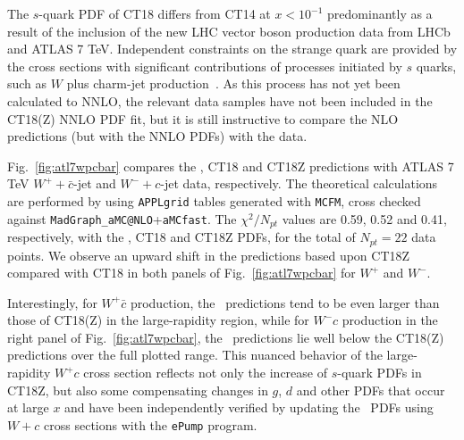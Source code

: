 The $s$-quark PDF of CT18 differs from CT14 at $x < 10^{-1}$ predominantly as a result of the inclusion of the new LHC vector boson production data from  LHCb and ATLAS 7 TeV. Independent constraints on 
the strange quark are provided by the cross sections with significant contributions of  processes initiated by $s$ quarks, such as $W$ plus charm-jet production~\cite{Yalkun:2019gah}. As this process has not yet been calculated to NNLO, the relevant data samples have not been included in the CT18(Z) NNLO PDF fit, but it is still instructive to compare the NLO predictions (but with the NNLO PDFs) with the data. 

Fig.~\ref{fig:atl7wpcbar} compares the \CTHERAII, CT18 and CT18Z predictions with ATLAS 7 TeV $W^+ + \bar{c}$-jet and $W^-\! +\! c$-jet data, respectively. The theoretical calculations are performed by using \texttt{APPLgrid} tables generated with \texttt{MCFM}, cross checked against \texttt{MadGraph\_aMC@NLO}+\texttt{aMCfast}. The $\chi^2/N_{pt}$ values are 0.59, 0.52 and 0.41, respectively, with the \CTHERAII, CT18 and CT18Z PDFs, for the total of $N_{pt}=22$ data points.
We observe an upward shift in the predictions based upon CT18Z compared with CT18 in both panels of Fig.~\ref{fig:atl7wpcbar} for $W^+$ and $W^-$. 

Interestingly, for $W^+\bar{c}$ production, the 
\CTHERAII~predictions tend to be even larger than those of CT18(Z) in the large-rapidity region, while for $W^-c$ production in the
right panel of Fig.~\ref{fig:atl7wpcbar}, the \CTHERAII~predictions lie well below the CT18(Z) predictions over the full plotted range. This 
nuanced behavior of the large-rapidity $W^+c$ cross section reflects not only the increase of $s$-quark PDFs in CT18Z, but also some compensating changes in $g$, $d$ and other PDFs that occur at large $x$ and have been independently verified by updating the \CTHERAII\, PDFs using $W+c$ cross sections with the \texttt{ePump} program.

